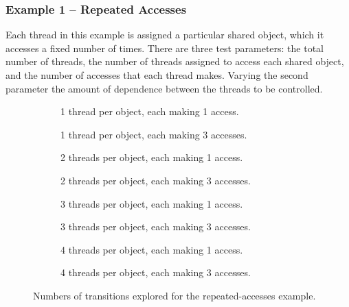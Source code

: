 \documentclass[12pt,a4paper,twoside,openright]{report}
\newenvironment{figtile} %
{\begin{subfigure}{0.48\textwidth}
		\def\svgwidth{\textwidth}
		\captionsetup{font=footnotesize}
	}
	{\end{subfigure}}
\begin{document}
\subsubsection{Example 1 -- Repeated Accesses}
Each thread in this example is assigned a particular
shared object, which it accesses a
fixed number of times. There are three test parameters:
the total number of threads, the number of threads
assigned to access each shared object, and the
number of accesses that each thread
makes. Varying the second parameter
the amount of dependence between the threads
to be controlled.

\begin{figure}
	\centering
	\footnotesize
	\begin{figtile}
		
		\caption{1 thread per object,
			each making 1 access.}
	\end{figtile}%
	\quad
	\begin{figtile}
		
		\caption{1 thread per object,
			each making 3 accesses.}
	\end{figtile}
	\begin{figtile}
		
		\caption{2 threads per object,
			each making 1 access.}
	\end{figtile}%
	\quad
	\begin{figtile}
		
		\caption{2 threads per object,
			each making 3 accesses.}
	\end{figtile}
	\begin{figtile}
		
		\caption{3 threads per object,
			each making 1 access.}
	\end{figtile}%
	\quad
	\begin{figtile}
		
		\caption{3 threads per object,
			each making 3 accesses.}
	\end{figtile}
	\begin{figtile}
		
		\caption{4 threads per object,
			each making 1 access.}
	\end{figtile}%
	\quad
	\begin{figtile}
		
		\caption{4 threads per object,
			each making 3 accesses.}
		\label{fig:repeated-access-trans-h}
	\end{figtile}
	\caption{Numbers of transitions
		explored for the repeated-accesses example.}
	\label{fig:repeated-access-trans}
\end{figure}
\end{document}

